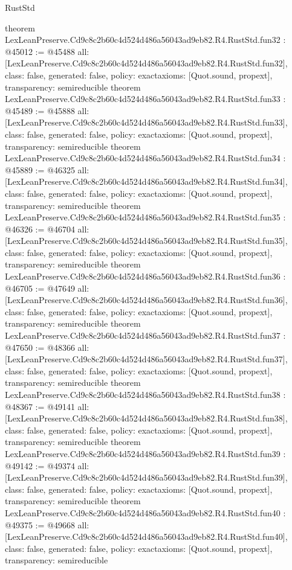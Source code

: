 \begin{lexlean}{RustStd}
\begin{coremodule}
{}
theorem LexLeanPreserve.Cd9c8c2b60c4d524d486a56043ad9eb82.R4.RustStd.fun32 : @45012 := @45488 {
  all: [LexLeanPreserve.Cd9c8c2b60c4d524d486a56043ad9eb82.R4.RustStd.fun32],
  class: false,
  generated: false,
  policy: exact{axioms: [Quot.sound, propext]},
  transparency: semireducible
}
theorem LexLeanPreserve.Cd9c8c2b60c4d524d486a56043ad9eb82.R4.RustStd.fun33 : @45489 := @45888 {
  all: [LexLeanPreserve.Cd9c8c2b60c4d524d486a56043ad9eb82.R4.RustStd.fun33],
  class: false,
  generated: false,
  policy: exact{axioms: [Quot.sound, propext]},
  transparency: semireducible
}
theorem LexLeanPreserve.Cd9c8c2b60c4d524d486a56043ad9eb82.R4.RustStd.fun34 : @45889 := @46325 {
  all: [LexLeanPreserve.Cd9c8c2b60c4d524d486a56043ad9eb82.R4.RustStd.fun34],
  class: false,
  generated: false,
  policy: exact{axioms: [Quot.sound, propext]},
  transparency: semireducible
}
theorem LexLeanPreserve.Cd9c8c2b60c4d524d486a56043ad9eb82.R4.RustStd.fun35 : @46326 := @46704 {
  all: [LexLeanPreserve.Cd9c8c2b60c4d524d486a56043ad9eb82.R4.RustStd.fun35],
  class: false,
  generated: false,
  policy: exact{axioms: [Quot.sound, propext]},
  transparency: semireducible
}
theorem LexLeanPreserve.Cd9c8c2b60c4d524d486a56043ad9eb82.R4.RustStd.fun36 : @46705 := @47649 {
  all: [LexLeanPreserve.Cd9c8c2b60c4d524d486a56043ad9eb82.R4.RustStd.fun36],
  class: false,
  generated: false,
  policy: exact{axioms: [Quot.sound, propext]},
  transparency: semireducible
}
theorem LexLeanPreserve.Cd9c8c2b60c4d524d486a56043ad9eb82.R4.RustStd.fun37 : @47650 := @48366 {
  all: [LexLeanPreserve.Cd9c8c2b60c4d524d486a56043ad9eb82.R4.RustStd.fun37],
  class: false,
  generated: false,
  policy: exact{axioms: [Quot.sound, propext]},
  transparency: semireducible
}
theorem LexLeanPreserve.Cd9c8c2b60c4d524d486a56043ad9eb82.R4.RustStd.fun38 : @48367 := @49141 {
  all: [LexLeanPreserve.Cd9c8c2b60c4d524d486a56043ad9eb82.R4.RustStd.fun38],
  class: false,
  generated: false,
  policy: exact{axioms: [Quot.sound, propext]},
  transparency: semireducible
}
theorem LexLeanPreserve.Cd9c8c2b60c4d524d486a56043ad9eb82.R4.RustStd.fun39 : @49142 := @49374 {
  all: [LexLeanPreserve.Cd9c8c2b60c4d524d486a56043ad9eb82.R4.RustStd.fun39],
  class: false,
  generated: false,
  policy: exact{axioms: [Quot.sound, propext]},
  transparency: semireducible
}
theorem LexLeanPreserve.Cd9c8c2b60c4d524d486a56043ad9eb82.R4.RustStd.fun40 : @49375 := @49668 {
  all: [LexLeanPreserve.Cd9c8c2b60c4d524d486a56043ad9eb82.R4.RustStd.fun40],
  class: false,
  generated: false,
  policy: exact{axioms: [Quot.sound, propext]},
  transparency: semireducible
}
\end{coremodule}
\end{lexlean}
